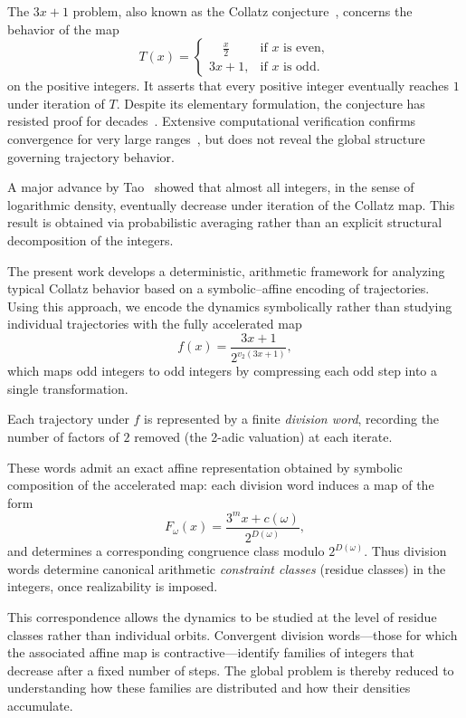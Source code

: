 \documentclass[12pt, oneside]{article}
\numberwithin{equation}{section}
\theoremstyle{definition}
\theoremstyle{plain}
\theoremstyle{remark}
\begin{document}
The $3x+1$ problem, also known as the Collatz conjecture~\cite{Collatz1937}, concerns
the behavior of the map
\[
T(x) =
\begin{cases}
\displaystyle
    \phantom{3x} \frac{x}{2} & \text {if } x \text{ is even}, \\[8pt]
\displaystyle
    3x+1,                    & \text{if $x$ is odd}.
\end{cases}
\]
on the positive integers. It asserts that every positive integer eventually reaches $1$
under iteration of $T$. Despite its elementary formulation, the conjecture has resisted
proof for decades~\cite{Lagarias2010,Terras1976}. Extensive computational verification
confirms convergence for very large ranges~\cite{OliveiraESilva2010}, but does not
reveal the global structure governing trajectory behavior.

A major advance by Tao~\cite{Tao2019} showed that almost all integers, in the sense of
logarithmic density, eventually decrease under iteration of the Collatz map. This result
is obtained via probabilistic averaging rather than an explicit structural decomposition
of the integers.

The present work develops a deterministic, arithmetic framework for analyzing typical
Collatz behavior based on a symbolic–affine encoding of trajectories. Using this approach,
we encode the dynamics symbolically rather than studying individual trajectories with
the fully accelerated map
\[
f(x)=\frac{3x+1}{2^{v_2(3x+1)}},
\]
which maps odd integers to odd integers by compressing each odd step into a single
transformation.

Each trajectory under $f$ is represented by a finite \emph{division word}, recording the
number of factors of $2$ removed (the 2-adic valuation) at each iterate.

These words admit an exact affine representation obtained by symbolic composition of the
accelerated map: each division word induces a map of the form
\[
F_\omega(x) = \frac{3^m x + c(\omega)}{2^{D(\omega)}},
\]
and determines a corresponding congruence class modulo $2^{D(\omega)}$. Thus division words
determine canonical arithmetic \emph{constraint classes} (residue classes) in the integers,
once realizability is imposed.

This correspondence allows the dynamics to be studied at the level of residue classes
rather than individual orbits. Convergent division words—those for which the associated
affine map is contractive—identify families of integers that decrease after a fixed
number of steps. The global problem is thereby reduced to understanding how these
families are distributed and how their densities accumulate.
\end{document}
